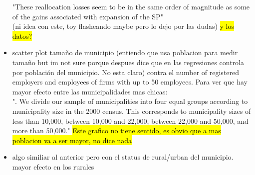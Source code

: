 \begin{itemize}
"These reallocation losses seem to be in the same order of magnitude as some of the gains associated with expansion of the SP"\\
(ni idea con este, toy flasheando maybe pero lo dejo por las dudas) 
  \hl{y los datos?}
 \item scatter plot tamaño de municipio (entiendo que usa poblacion para medir tamaño but im not sure porque despues dice que en las regresiones controla por población del municipio. No esta claro) contra el number of registered employers and employees of firms with up to 50 employees. Para ver que hay mayor efecto entre las municipalidades mas chicas: \\
 ". We divide our sample of municipalities into four equal groups according to municipality size in the 2000 census. This corresponds to municipality sizes of less than 10,000, between 10,000 and 22,000, between 22,000 and 50,000, and more than 50,000."
 \hl{Este grafico no tiene sentido, es obvio que a mas poblacion va a ser mayor, no dice nada}
 \item algo similiar al anterior pero con el status de rural/urban del municipio. mayor efecto en los rurales

 \end{itemize}